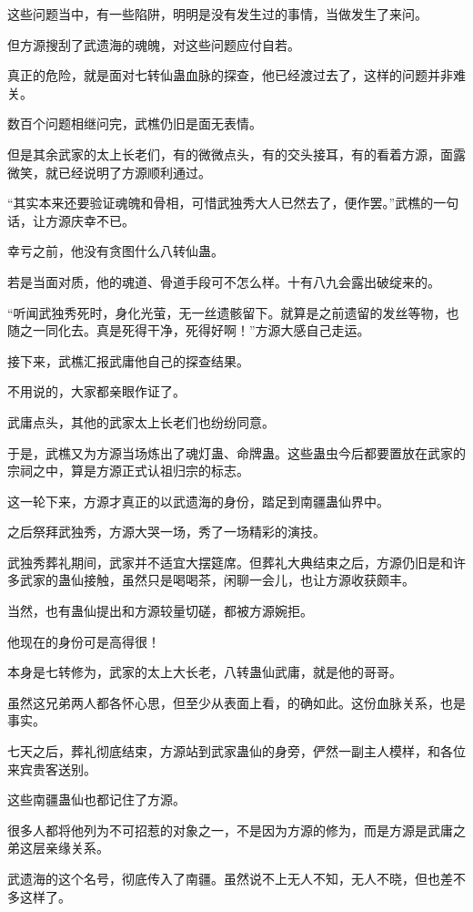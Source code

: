 \begin{this_body}
这些问题当中，有一些陷阱，明明是没有发生过的事情，当做发生了来问。

但方源搜刮了武遗海的魂魄，对这些问题应付自若。

真正的危险，就是面对七转仙蛊血脉的探查，他已经渡过去了，这样的问题并非难关。

数百个问题相继问完，武樵仍旧是面无表情。

但是其余武家的太上长老们，有的微微点头，有的交头接耳，有的看着方源，面露微笑，就已经说明了方源顺利通过。

“其实本来还要验证魂魄和骨相，可惜武独秀大人已然去了，便作罢。”武樵的一句话，让方源庆幸不已。

幸亏之前，他没有贪图什么八转仙蛊。

若是当面对质，他的魂道、骨道手段可不怎么样。十有八九会露出破绽来的。

“听闻武独秀死时，身化光萤，无一丝遗骸留下。就算是之前遗留的发丝等物，也随之一同化去。真是死得干净，死得好啊！”方源大感自己走运。

接下来，武樵汇报武庸他自己的探查结果。

不用说的，大家都亲眼作证了。

武庸点头，其他的武家太上长老们也纷纷同意。

于是，武樵又为方源当场炼出了魂灯蛊、命牌蛊。这些蛊虫今后都要置放在武家的宗祠之中，算是方源正式认祖归宗的标志。

这一轮下来，方源才真正的以武遗海的身份，踏足到南疆蛊仙界中。

之后祭拜武独秀，方源大哭一场，秀了一场精彩的演技。

武独秀葬礼期间，武家并不适宜大摆筵席。但葬礼大典结束之后，方源仍旧是和许多武家的蛊仙接触，虽然只是喝喝茶，闲聊一会儿，也让方源收获颇丰。

当然，也有蛊仙提出和方源较量切磋，都被方源婉拒。

他现在的身份可是高得很！

本身是七转修为，武家的太上大长老，八转蛊仙武庸，就是他的哥哥。

虽然这兄弟两人都各怀心思，但至少从表面上看，的确如此。这份血脉关系，也是事实。

七天之后，葬礼彻底结束，方源站到武家蛊仙的身旁，俨然一副主人模样，和各位来宾贵客送别。

这些南疆蛊仙也都记住了方源。

很多人都将他列为不可招惹的对象之一，不是因为方源的修为，而是方源是武庸之弟这层亲缘关系。

武遗海的这个名号，彻底传入了南疆。虽然说不上无人不知，无人不晓，但也差不多这样了。


\end{this_body}
